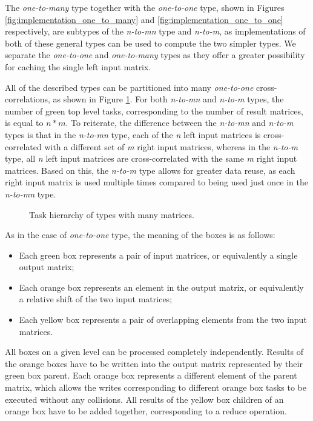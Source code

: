 The \textit{one-to-many} type together with the \textit{one-to-one} type, shown in Figures \ref{fig:implementation_one_to_many} and \ref{fig:implementation_one_to_one} respectively, are subtypes of the \textit{n-to-mn} type and \textit{n-to-m}, as implementations of both of these general types can be used to compute the two simpler types. We separate the \textit{one-to-one} and \textit{one-to-many} types as they offer a greater possibility for caching the single left input matrix.

All of the described types can be partitioned into many \textit{one-to-one} cross-correlations, as shown in Figure \ref{fig:cross_corr_many_tasks}. For both \textit{n-to-mn} and \textit{n-to-m} types, the number of green top level tasks, corresponding to the number of result matrices, is equal to $n*m$. To reiterate, the difference between the \textit{n-to-mn} and \textit{n-to-m} types is that in the \textit{n-to-mn} type, each of the \textit{n} left input matrices is cross-correlated with a different set of \textit{m} right input matrices, whereas in the \textit{n-to-m} type, all \textit{n} left input matrices are cross-correlated with the same \textit{m} right input matrices. Based on this, the \textit{n-to-m} type allows for greater data reuse, as each right input matrix is used multiple times compared to being used just once in the \textit{n-to-mn} type. 

\begin{figure}[ht]
	\centering
	\def\svgwidth{0.8\textwidth}
	
	\caption{Task hierarchy of types with many matrices.}
	\label{fig:cross_corr_many_tasks}
\end{figure}

As in the case of \textit{one-to-one} type, the meaning of the boxes is as follows:

\begin{itemize}
	\item Each green box represents a pair of input matrices, or equivalently a single output matrix;
	\item Each orange box represents an element in the output matrix, or equivalently a relative shift of the two input matrices;
	\item Each yellow box represents a pair of overlapping elements from the two input matrices.
\end{itemize}

All boxes on a given level can be processed completely independently.  Results of the orange boxes have to be written into the output matrix represented by their green box parent. Each orange box represents a different element of the parent matrix, which allows the writes corresponding to different orange box tasks to be executed without any collisions. All results of the yellow box children of an orange box have to be added together, corresponding to a reduce operation.


